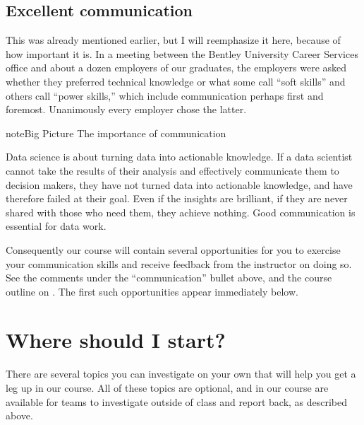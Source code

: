\documentclass[letterpaper,10pt,english]{sphinxmanual}
\begin{document}
\subsection{Excellent communication}
\label{\detokenize{chapter-1-intro-to-data-science:excellent-communication}}
This was already mentioned earlier, but I will re\sphinxhyphen{}emphasize it here, because of how important it is.  In a meeting between the Bentley University Career Services office and about a dozen employers of our graduates, the employers were asked whether they preferred technical knowledge or what some call “soft skills” and others call “power skills,” which include communication perhaps first and foremost.  Unanimously every employer chose the latter.

\begin{sphinxadmonition}{note}{Big Picture \sphinxhyphen{} The importance of communication}

Data science is about turning data into actionable knowledge.  If a data scientist cannot take the results of their analysis and effectively communicate them to decision makers, they have not turned data into actionable knowledge, and have therefore failed at their goal.  Even if the insights are brilliant, if they are never shared with those who need them, they achieve nothing.  Good communication is essential for data work.
\end{sphinxadmonition}

Consequently our course will contain several opportunities for you to exercise your communication skills and receive feedback from the instructor on doing so.  See the comments under the “communication” bullet above, and the course outline on {\hyperref[\detokenize{intro::doc}]{}}.  The first such opportunities appear immediately below.


\section{Where should I start?}
\label{\detokenize{chapter-1-intro-to-data-science:where-should-i-start}}
There are several topics you can investigate on your own that will help you get a leg up in our course.  All of these topics are optional, and in our course are available for teams to investigate outside of class and report back, as described above.
\end{document}
